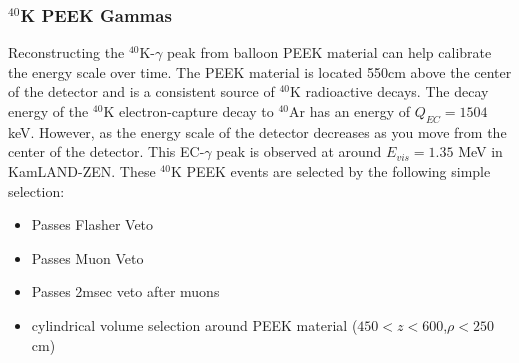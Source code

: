 \subsubsection*{$^{40}$K PEEK Gammas}
Reconstructing the $^{40}$K-$\gamma$ peak from balloon PEEK material can help calibrate the energy scale over time. The PEEK material is located 550cm above the center of the detector and is a consistent source of $^{40}$K radioactive decays. The decay energy of the $^{40}$K electron-capture decay to $^{40}$Ar has an energy of $Q_{EC}=1504$ keV. However, as the energy scale of the detector decreases as you move from the center of the detector. This EC-$\gamma$ peak is observed at around $E_{vis}=1.35$ MeV in KamLAND-ZEN. These $^{40}$K PEEK events are selected by the following simple selection:
\begin{itemize}
	\item Passes Flasher Veto
	\item Passes Muon Veto
	\item Passes 2msec veto after muons
	\item cylindrical volume selection around PEEK material ($450<z<600$,$\rho<250$ cm)
\end{itemize}

